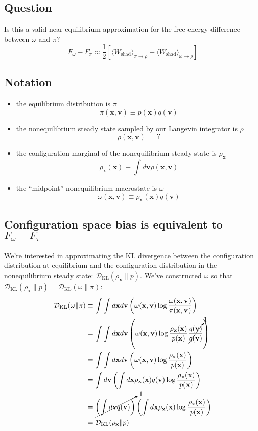 \documentclass[11pt]{article}
\newcommand{\x}{\mathbf{x}}
\newcommand{\vel}{\mathbf{v}}
\newcommand{\kldiv}{\mathcal{D}_\text{KL}}
\begin{document}
\subsection*{Question}
Is this a valid near-equilibrium approximation for the free energy difference between $\omega$ and $\pi$?
$$F_\omega - F_\pi \approx\frac{1}{2} \left[
\langle W_\text{shad} \rangle_{\pi \to \rho}
- \langle W_\text{shad} \rangle_{\omega \to \rho} \right]$$


\subsection*{Notation}
\begin{itemize}
\item the equilibrium distribution is $\pi$
$$\pi(\x, \vel) \equiv p(\x) q(\vel)$$
\item the nonequilibrium steady state sampled by our Langevin integrator is $\rho$
$$\rho(\x, \vel) = \; ?$$
\item the configuration-marginal of the nonequilibrium steady state is $\rho_\x$
$$\rho_\x(\x) \equiv \int d\vel \rho(\x, \vel)$$
\item the ``midpoint'' nonequilibrium macrostate is $\omega$
$$\omega(\x, \vel) \equiv \rho_\x (\x) q(\vel)$$
\end{itemize}

\subsection*{Configuration space bias is equivalent to $F_\omega - F_\pi$}
We're interested in approximating the KL divergence between the configuration distribution at equilibrium and the configuration distribution in the nonequilibrium steady state: $\kldiv(\rho_\x \| p)$.
We've constructed $\omega$ so that $\kldiv(\rho_\x \| p) = \kldiv( \omega \| \pi)$:
$$\begin{aligned}
\kldiv(\omega \| \pi) &\equiv \int \int d \x d\vel \left( \omega(\x, \vel) \log \frac{\omega(\x, \vel)}{\pi(\x, \vel)} \right)\\
&= \int \int d \x d\vel \left( \omega(\x, \vel) \log \frac{\rho_\x (\x)}{p(\x)}  \cancelto{1}{\frac{q(\vel)}{q(\vel)}}\right)\\
&= \int \int d \x d\vel \left( \omega(\x, \vel) \log \frac{\rho_\x (\x)}{p(\x)}  \right)\\
&= \int d \vel \left( \int d \x \rho_\x (\x) q(\vel) \log \frac{\rho_\x (\x)}{p(\x)} \right) \\
&= \cancelto{1}{\left( \int d \vel q(\vel) \right)} \left( \int d \x \rho_\x (\x) \log \frac{\rho_\x (\x)}{p(\x)} \right) \\
&= \kldiv(\rho_\x \| p)
\end{aligned}
$$
\end{document}

